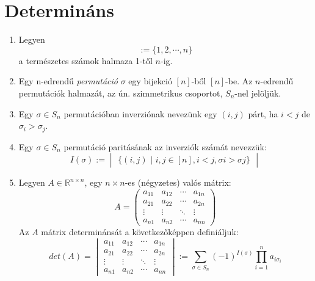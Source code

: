 \documentclass{article}
\begin{document}
\section{Determináns}
\begin{enumerate}[label=\alph*)] 
\item Legyen
\begin{equation}
[n]:= \{ 1,2,\cdots, n \}
\end{equation}
a természetes számok halmaza 1-től $n$-ig.
\item Egy n-edrendű \textit{permutáció} $\sigma$ egy bijekció $[n]$-ből $[n]$-be. Az $n$-edrendű permutációk halmazát, az ún. szimmetrikus csoportot, $S_n$-nel jelöljük.
\item Egy $\sigma \in S_n$ permutációban inverziónak nevezünk egy $(i,j)$ párt, ha $i < j$ de $\sigma_i > \sigma_j$.
\item Egy $\sigma \in S_n$ permutáció paritásának az inverziók számát nevezzük:
\begin{equation}
I(\sigma) := 
\begin{vmatrix}
\{(i,j)\text{ | }i,j \in [n], i<j, \sigma i> \sigma j\} 
\end{vmatrix}
\end{equation}
\item Legyen $A \in \mathbb{R}^{n\times n}$, egy $n\times n$-es (négyzetes) valós mátrix:
\begin{equation}
A=
\begin{pmatrix}
a_{11} & a_{12} & \cdots & a_{1n} \\
a_{21} & a_{22} & \cdots & a_{2n} \\
\vdots & \vdots & \ddots & \vdots \\
a_{n1} & a_{n2} & \cdots & a_{nn}
\end{pmatrix}
\end{equation}
Az $A$ mátrix determinánsát a következőképpen definiáljuk:
\begin{equation}
det(A) = 
\begin{vmatrix}
a_{11} & a_{12} & \cdots & a_{1n} \\
a_{21} & a_{22} & \cdots & a_{2n} \\
\vdots & \vdots & \ddots & \vdots \\
a_{n1} & a_{n2} & \cdots & a_{nn}
\end{vmatrix} := \sum_{\sigma \in S_n} (-1)^{I(\sigma)} \prod_{i=1}^n a_{i\sigma_i}
\end{equation}
\end{enumerate}
\newpage
\end{document}
